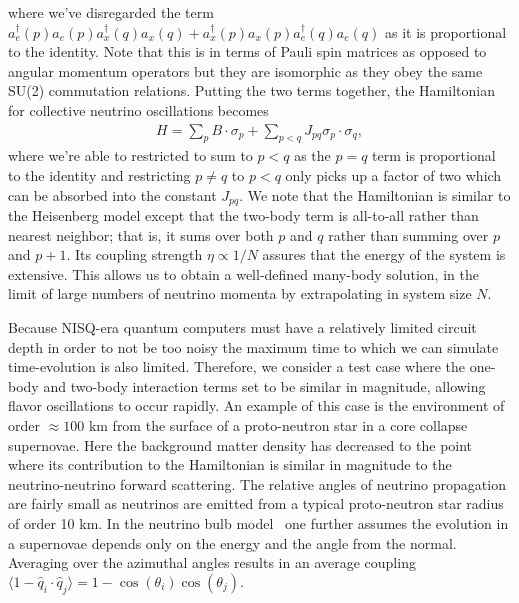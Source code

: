 \documentclass[Dual]{msu-thesis}
\begin{document}
where we've disregarded the term $a_e^\dagger(p)a_e(p)a_x^\dagger(q)a_x(q)+a_x^\dagger(p)a_x(p)a_e^\dagger(q)a_e(q)$ as it is proportional to the identity. Note that this is in terms of Pauli spin matrices as opposed to angular momentum operators but they are isomorphic as they obey the same SU(2) commutation relations. Putting the two terms together, the Hamiltonian for collective neutrino oscillations becomes
\begin{align}
\label{cno_hamiltonian}
H=\sum_pB\cdot\sigma_p+\sum_{p<q}J_{pq}\sigma_p\cdot\sigma_q
,\end{align}
where we're able to restricted to sum to $p<q$ as the $p=q$ term is proportional to the identity and restricting $p\neq q$ to $p<q$ only picks up a factor of two which can be absorbed into the constant $J_{pq}$. We note that the Hamiltonian is similar to the Heisenberg model except that the two-body term is all-to-all rather than nearest neighbor; that is, it sums over both $p$ and $q$ rather than summing over $p$ and $p+1$. Its coupling strength $\eta\propto1/N$ assures that the energy of the system is extensive. This allows us to obtain a well-defined many-body solution, in the limit of large
numbers of neutrino momenta by extrapolating in system size $N$.

Because NISQ-era quantum computers must have a relatively limited circuit depth in order to not be too noisy 
the maximum time to which we can simulate time-evolution is also limited. Therefore, we consider a test case where the one-body and two-body interaction terms set to be similar in magnitude, allowing flavor oscillations to occur rapidly. An example of this case is the environment of order $\approx100$ km from the surface of a proto-neutron star in a core collapse supernovae. Here the background matter density has decreased to the point where its contribution to the Hamiltonian is similar in magnitude to the neutrino-neutrino forward scattering. The relative angles of neutrino propagation are fairly small as neutrinos are emitted from a typical proto-neutron star radius of order 10 km. In the neutrino bulb model~\cite{Duan:2006} one further assumes the evolution in a supernovae depends only on the energy and the angle from the normal. Averaging over the azimuthal angles results in an average
coupling $\langle 1-{\hat {q}}_i \cdot {\hat {q}}_j \rangle = 1 - \cos(\theta_i) \cos(\theta_j).$
\end{document}
